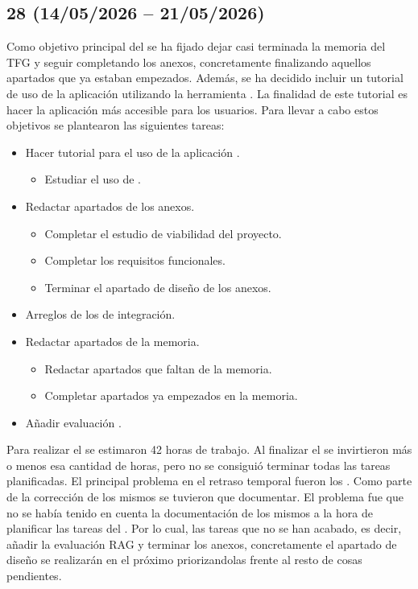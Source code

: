 \subsection{ 28 (14/05/2026 -- 21/05/2026)}
Como objetivo principal del  se ha fijado dejar casi terminada la memoria del TFG y seguir completando los anexos, concretamente finalizando aquellos apartados que ya estaban empezados. Además, se ha decidido incluir un tutorial de uso de la aplicación utilizando la herramienta . La finalidad de este tutorial es hacer la aplicación más accesible para los usuarios. Para llevar a cabo estos objetivos se plantearon las siguientes tareas:

\begin{itemize}
\tightlist
	\item Hacer tutorial para el uso de la aplicación .
	\begin{itemize}
	\tightlist
		\item Estudiar el uso de .
	\end{itemize}
	\item Redactar apartados de los anexos.
	\begin{itemize}
	\tightlist
		\item Completar el estudio de viabilidad del proyecto.
		\item Completar los requisitos funcionales.
		\item Terminar el apartado de diseño de los anexos.
	\end{itemize}
	\item Arreglos de los  de integración.
	\item Redactar apartados de la memoria.
	\begin{itemize}
	\tightlist
		\item Redactar apartados que faltan de la memoria.
		\item Completar apartados ya empezados en la memoria.
	\end{itemize}
	\item Añadir evaluación .
\end{itemize}

Para realizar el  se estimaron 42 horas de trabajo. Al finalizar el  se invirtieron más o menos esa cantidad de horas, pero no se consiguió terminar todas las tareas planificadas. El principal problema en el retraso temporal fueron los . Como parte de la corrección de los mismos se tuvieron que documentar. El problema fue que no se había tenido en cuenta la documentación de los mismos a la hora de planificar las tareas del . Por lo cual, las tareas que no se han acabado, es decir, añadir la evaluación RAG y terminar los anexos, concretamente el apartado de diseño se realizarán en el próximo  priorizandolas frente al resto de cosas pendientes. 

